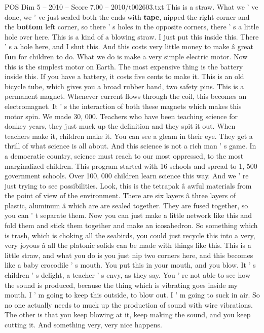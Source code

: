 \begin{textsample}{POS Dim 5 – 2010 – Score 7.00 – 2010/t002603.txt}
This is a straw.
What we ' ve done, we ' ve just sealed both the ends with \textbf{tape}, nipped the right corner and the \textbf{bottom} left corner, so there ' s holes in the opposite corners, there ' s a little hole over here.
This is a kind of a blowing straw.
I just put this inside this.
There ' s a hole here, and I shut this.
And this costs very little money to make â great \textbf{fun} for children to do.
What we do is make a very simple electric motor.
Now this is the simplest motor on Earth.
The most expensive thing is the battery inside this.
If you have a battery, it costs five cents to make it.
This is an old bicycle tube, which gives you a broad rubber band, two safety pins.
This is a permanent magnet.
Whenever current flows through the coil, this becomes an electromagnet.
It ' s the interaction of both these magnets which makes this motor spin.
We made 30, 000.
Teachers who have been teaching science for donkey years, they just muck up the definition and they spit it out.
When teachers make it, children make it.
You can see a gleam in their eye.
They get a thrill of what science is all about.
And this science is not a rich man ' s game.
In a democratic country, science must reach to our most oppressed, to the most marginalized children.
This program started with 16 schools and spread to 1, 500 government schools.
Over 100, 000 children learn science this way.
And we ' re just trying to see possibilities.
Look, this is the tetrapak â awful materials from the point of view of the environment.
There are six layers â three layers of plastic, aluminum â which are are sealed together.
They are fused together, so you can ' t separate them.
Now you can just make a little network like this and fold them and stick them together and make an icosahedron.
So something which is trash, which is choking all the seabirds, you could just recycle this into a very, very joyous â all the platonic solids can be made with things like this.
This is a little straw, and what you do is you just nip two corners here, and this becomes like a baby crocodile ' s mouth.
You put this in your mouth, and you blow.
It ' s children ' s delight, a teacher ' s envy, as they say.
You ' re not able to see how the sound is produced, because the thing which is vibrating goes inside my mouth.
I ' m going to keep this outside, to blow out.
I ' m going to suck in air.
So no one actually needs to muck up the production of sound with wire vibrations.
The other is that you keep blowing at it, keep making the sound, and you keep cutting it.
And something very, very nice happens.

\end{textsample}
